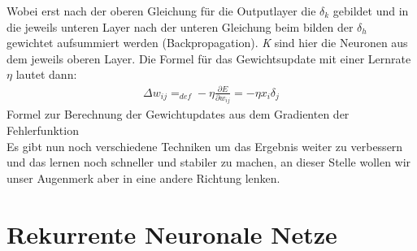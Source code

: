 Wobei erst nach der oberen Gleichung für die Outputlayer die \(\delta_{k}\) gebildet und in die jeweils unteren Layer nach der unteren Gleichung beim bilden der \(\delta_{h}\) gewichtet aufsummiert werden (Backpropagation). \textit{K} sind hier die Neuronen aus dem jeweils oberen Layer. Die Formel für das Gewichtsupdate mit einer Lernrate \(\eta\) lautet dann:
\begin{gather}	
	\Delta w_{ij} =_{def}  -\eta \frac{\partial E}{\partial w_{ij}} = -\eta x_{i}\delta_{j}  
\end{gather} 
Formel zur Berechnung der Gewichtupdates aus dem Gradienten der Fehlerfunktion \cite{bib:bp}\\
Es gibt nun noch verschiedene Techniken um das Ergebnis weiter zu verbessern und das lernen noch schneller und stabiler zu machen, an dieser Stelle wollen wir unser Augenmerk aber in eine andere Richtung lenken. 
\section{Rekurrente Neuronale Netze}

